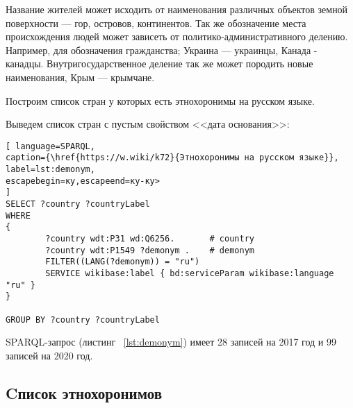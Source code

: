 Название жителей может исходить от наименования различных объектов земной поверхности — гор, островов, континентов. Так же обозначение места происхождения людей может зависеть от политико-административного делению. Например, для обозначения гражданства; Украина — украинцы, Канада - канадцы. Внутригосударственное деление так же может породить новые наименования, Крым — крымчане.

Построим список стран у которых есть этнохоронимы на русском языке.

Выведем список стран с пустым свойством <<дата основания>>:



\begin{lstlisting}[ language=SPARQL, 
caption={\href{https://w.wiki/k72}{Этнохоронимы на русском языке}},
label=lst:demonym, 
escapebegin=ку,escapeend=ку-ку>
]
SELECT ?country ?countryLabel 
WHERE
{
		?country wdt:P31 wd:Q6256.       # country
		?country wdt:P1549 ?demonym .    # demonym
		FILTER((LANG(?demonym)) = "ru")
		SERVICE wikibase:label { bd:serviceParam wikibase:language "ru" }
}

GROUP BY ?country ?countryLabel
\end{lstlisting}

SPARQL-запрос (листинг ~\ref{lst:demonym}) имеет 28 записей на 2017 год и 99 записей на 2020 год.

\subsection{Cписок этнохоронимов}


